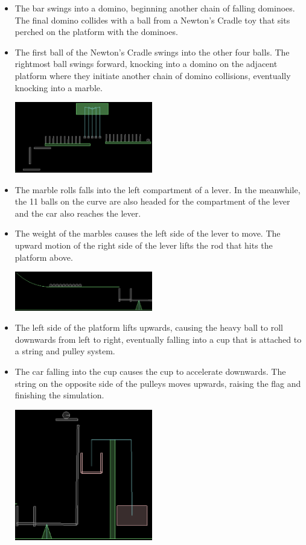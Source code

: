 \documentclass[11pt, a4paper]{article}
\begin{document}
\begin{itemize}
\item The bar swings into a domino, beginning another chain of falling dominoes. The final domino
collides with a ball from a Newton’s Cradle toy that sits perched on the platform with the dominoes.
\item The first ball of the Newton’s Cradle swings into the other four balls. The rightmost ball swings
forward, knocking into a domino on the adjacent platform where they initiate another chain of domino
collisions, eventually knocking into a marble.

\begin{center}
\includegraphics[width = 6cm]{ReportImages/domino.eps}
\end{center} 


\item The marble rolls falls into the left compartment of a lever. In the meanwhile, the 11 balls on the curve are also headed for the compartment of the lever and the car also reaches the lever.
\item The weight of the marbles causes the left side of the lever to move. The upward motion of the right side
of the lever lifts the rod that hits the platform above.

\begin{center}
\includegraphics[width = 6cm]{ReportImages/curve.eps}
\end{center} 


\item The left side of the platform lifts upwards, causing the heavy ball to roll downwards from left to right,
eventually falling into a cup that is attached to a string and pulley system.
\item The car falling into the cup causes the cup to accelerate downwards. The string on the opposite side of
the pulleys moves upwards, raising the flag and finishing the simulation.

\begin{center}
\includegraphics[width = 6cm]{ReportImages/see-saw.eps}
\end{center} 



\end{itemize}
\end{document}
